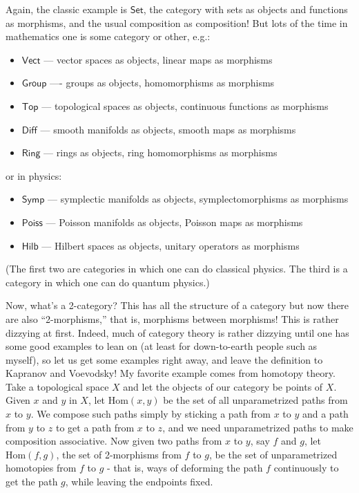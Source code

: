 \documentclass{article}
\def\tightlist{}
\begin{document}
Again, the classic example is \(\mathsf{Set}\), the category with sets
as objects and functions as morphisms, and the usual composition as
composition! But lots of the time in mathematics one is some category or
other, e.g.:

\begin{itemize}
\tightlist
\item
  \(\mathsf{Vect}\) --- vector spaces as objects, linear maps as
  morphisms
\item
  \(\mathsf{Group}\) ---- groups as objects, homomorphisms as morphisms
\item
  \(\mathsf{Top}\) --- topological spaces as objects, continuous
  functions as morphisms
\item
  \(\mathsf{Diff}\) --- smooth manifolds as objects, smooth maps as
  morphisms
\item
  \(\mathsf{Ring}\) --- rings as objects, ring homomorphisms as
  morphisms
\end{itemize}

or in physics:

\begin{itemize}
\tightlist
\item
  \(\mathsf{Symp}\) --- symplectic manifolds as objects,
  symplectomorphisms as morphisms
\item
  \(\mathsf{Poiss}\) --- Poisson manifolds as objects, Poisson maps as
  morphisms
\item
  \(\mathsf{Hilb}\) --- Hilbert spaces as objects, unitary operators as
  morphisms
\end{itemize}

(The first two are categories in which one can do classical physics. The
third is a category in which one can do quantum physics.)

Now, what's a 2-category? This has all the structure of a category but
now there are also ``2-morphisms,'' that is, morphisms between
morphisms! This is rather dizzying at first. Indeed, much of category
theory is rather dizzying until one has some good examples to lean on
(at least for down-to-earth people such as myself), so let us get some
examples right away, and leave the definition to Kapranov and Voevodsky!
My favorite example comes from homotopy theory. Take a topological space
\(X\) and let the objects of our category be points of \(X\). Given
\(x\) and \(y\) in \(X\), let \(\mathrm{Hom}(x,y)\) be the set of all
unparametrized paths from \(x\) to \(y\). We compose such paths simply
by sticking a path from \(x\) to \(y\) and a path from \(y\) to \(z\) to
get a path from \(x\) to \(z\), and we need unparametrized paths to make
composition associative. Now given two paths from \(x\) to \(y\), say
\(f\) and \(g\), let \(\mathrm{Hom}(f,g)\), the set of 2-morphisms from
\(f\) to \(g\), be the set of unparametrized homotopies from \(f\) to
\(g\) - that is, ways of deforming the path \(f\) continuously to get
the path \(g\), while leaving the endpoints fixed.
\end{document}
